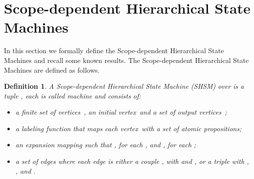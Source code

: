 \documentclass[letterpaper,twocolumn,10pt]{article}
\newtheorem{definition}{Definition}
\newcommand{\VHSM}{SHSM}
\newcommand{\vertex}{\mbox{vertex}}   \newcommand{\vertices}{\mbox{vertices}}
\begin{document}
\section{Scope-dependent  Hierarchical State Machines}\label{sec:hierarDefinition}
In this section we  formally define the Scope-dependent Hierarchical State Machines and
recall some known results.
The Scope-dependent Hierarchical State Machines are defined as follows.
\begin{definition}
A {\em Scope-dependent Hierarchical State Machine}
(\VHSM) over  is a tuple , each
 is called {\em
machine} and consists of:
\begin{itemize}
\item a finite set of \vertices\ ,
an {\em initial} \vertex\ 
and a set of {\em output} \vertices\ ;
\item a labeling function  that
maps each \vertex\ with a set of atomic propositions;
\item an expansion mapping 
such that , for each , and
, for each ;
\item a set of edges  where each edge is
either a couple , with  and
, or a triple  with
, , and
.
\end{itemize}
\end{definition}
\end{document}

